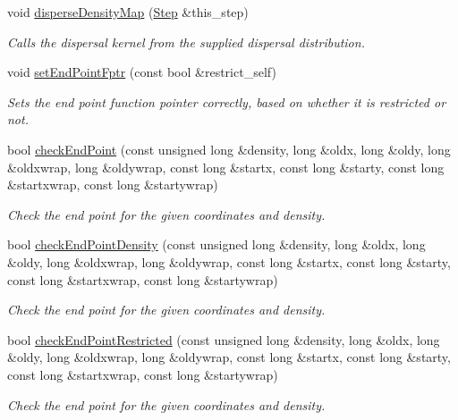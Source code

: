 \begin{DoxyCompactItemize}
void \hyperlink{class_dispersal_coordinator_a79b6018cda012a59f7b80de40b394a6a}{disperse\+Density\+Map} (\hyperlink{struct_step}{Step} \&this\+\_\+step)
\begin{DoxyCompactList}\small\item\em Calls the dispersal kernel from the supplied dispersal distribution. \end{DoxyCompactList}\item 
void \hyperlink{class_dispersal_coordinator_ae72980ec66825c641545675037885248}{set\+End\+Point\+Fptr} (const bool \&restrict\+\_\+self)
\begin{DoxyCompactList}\small\item\em Sets the end point function pointer correctly, based on whether it is restricted or not. \end{DoxyCompactList}\item 
bool \hyperlink{class_dispersal_coordinator_a46fe28ad569bda217e168b33216a888b}{check\+End\+Point} (const unsigned long \&density, long \&oldx, long \&oldy, long \&oldxwrap, long \&oldywrap, const long \&startx, const long \&starty, const long \&startxwrap, const long \&startywrap)
\begin{DoxyCompactList}\small\item\em Check the end point for the given coordinates and density. \end{DoxyCompactList}\item 
bool \hyperlink{class_dispersal_coordinator_a72d8a718590c6dde6f0e8d1ac991d99d}{check\+End\+Point\+Density} (const unsigned long \&density, long \&oldx, long \&oldy, long \&oldxwrap, long \&oldywrap, const long \&startx, const long \&starty, const long \&startxwrap, const long \&startywrap)
\begin{DoxyCompactList}\small\item\em Check the end point for the given coordinates and density. \end{DoxyCompactList}\item 
bool \hyperlink{class_dispersal_coordinator_a055c62c70087ab163bede5c4c4a8be33}{check\+End\+Point\+Restricted} (const unsigned long \&density, long \&oldx, long \&oldy, long \&oldxwrap, long \&oldywrap, const long \&startx, const long \&starty, const long \&startxwrap, const long \&startywrap)
\begin{DoxyCompactList}\small\item\em Check the end point for the given coordinates and density. \end{DoxyCompactList}\item 

\end{DoxyCompactItemize}
